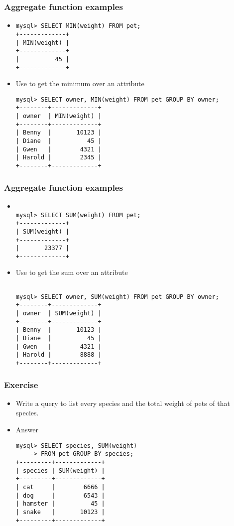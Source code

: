 \documentclass[hyperref={pdfpagelabels=false},svgnames,xcolor=table]{beamer}
\begin{document}
\begin{frame}[shrink=10,fragile]
  \frametitle{Aggregate function examples}
  \begin{itemize}
    \item {\color{blue}{MIN}}
\begin{verbatim}
mysql> SELECT MIN(weight) FROM pet;
+-------------+
| MIN(weight) |
+-------------+
|          45 |
+-------------+

\end{verbatim}
    \item Use {\color{blue}{GROUP BY}} to get the minimum over an attribute
\begin{verbatim}
mysql> SELECT owner, MIN(weight) FROM pet GROUP BY owner;
+--------+-------------+
| owner  | MIN(weight) |
+--------+-------------+
| Benny  |       10123 |
| Diane  |          45 |
| Gwen   |        4321 |
| Harold |        2345 |
+--------+-------------+
\end{verbatim}
  \end{itemize}
\end{frame}

\begin{frame}[shrink=10,fragile]
  \frametitle{Aggregate function examples}
  \begin{itemize}
    \item {\color{blue}{SUM}}
\begin{verbatim}

mysql> SELECT SUM(weight) FROM pet;
+-------------+
| SUM(weight) |
+-------------+
|       23377 |
+-------------+

\end{verbatim}
    \item Use {\color{blue}{GROUP BY}} to get the sum over an attribute
\begin{verbatim}

mysql> SELECT owner, SUM(weight) FROM pet GROUP BY owner;
+--------+-------------+
| owner  | SUM(weight) |
+--------+-------------+
| Benny  |       10123 |
| Diane  |          45 |
| Gwen   |        4321 |
| Harold |        8888 |
+--------+-------------+
\end{verbatim}
  \end{itemize}
\end{frame}

\begin{frame}[fragile]
  \frametitle{Exercise}
  \begin{itemize}
    \item Write a query to list every species and the total weight of pets of
      that species.
    \item<2-> Answer
\begin{verbatim}
mysql> SELECT species, SUM(weight) 
    -> FROM pet GROUP BY species;
+---------+-------------+
| species | SUM(weight) |
+---------+-------------+
| cat     |        6666 |
| dog     |        6543 |
| hamster |          45 |
| snake   |       10123 |
+---------+-------------+
\end{verbatim}
  \end{itemize}
\end{frame}
\end{document}
